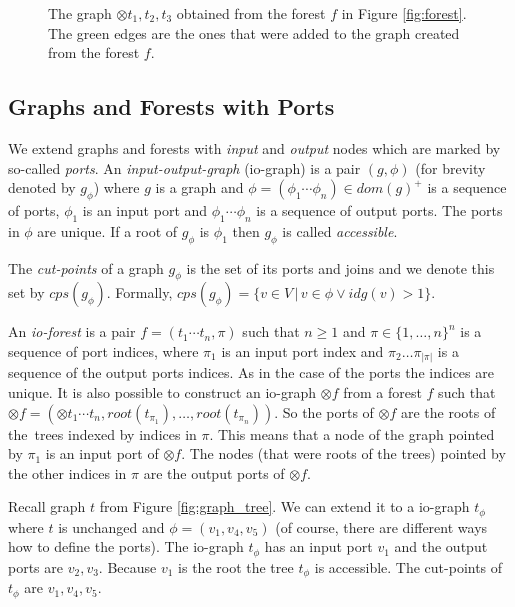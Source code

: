 	\begin{figure}[bth]
	\begin{center}
		
		\caption{The graph $\otimes t_1,t_2,t_3$ obtained from the forest $f$ in Figure \ref{fig:forest}.
		The green edges are the ones that were added to the graph created from the forest $f$.}
	  \label{fig:forest_graph}
	\end{center}
	\end{figure}
\vspace{-0.5cm}
\eexmp

\subsection{Graphs and Forests with Ports}
\label{subsec:gfp}

We extend graphs and forests with \emph{input} and \emph{output} nodes which are marked by so-called \emph{ports}.
An \emph{input-output-graph} (io-graph) is a pair $(g,\phi)$ (for brevity denoted by $g_\phi$)
where $g$ is a graph and $\phi=(\phi_1 \cdots \phi_n) \in dom(g)^+$ is a sequence of ports, $\phi_1$
is an input port and $\phi_1 \cdots \phi_n$ is a sequence of output ports.
The ports in $\phi$ are unique.
If a root of $g_\phi$ is $\phi_1$ then $g_\phi$ is called \emph{accessible}.

The \emph{cut-points} of a graph $g_\phi$ is the set of its ports
and joins and we denote this set by $cps(g_\phi)$.
Formally, $cps(g_\phi)=\{v \in V\,|\, v \in \phi \vee idg(v) > 1\}$.

An \emph{io-forest} is a pair $f=(t_1 \cdots t_n, \pi)$ such that $n \geq 1$ and $\pi \in \{1,\ldots,n\}^n$
is a sequence of port indices, where $\pi_1$ is an input port index and $\pi_2 \ldots \pi_{|\pi|}$ is a sequence
of the output ports indices.
As in the case of the ports the indices are unique.
It is also possible to construct an io-graph $\otimes f$ from a forest $f$ such that
$\otimes f = (\otimes t_1 \cdots t_n,root(t_{\pi_{1}}),\ldots,root(t_{\pi_{n}}))$.
So the ports of $\otimes f$ are the roots of the~trees indexed by indices in $\pi$.
This means that a node of the graph pointed by $\pi_1$ is an input port of $\otimes f$.
The nodes (that were roots of the trees) pointed by the other indices in $\pi$ are the output ports of $\otimes f$.

\bexmp
Recall graph $t$ from Figure \ref{fig:graph_tree}.
We can extend it to a io-graph $t_\phi$ where $t$ is unchanged and
$\phi=(v_1,v_4,v_5)$ (of course, there are different ways how to define the ports).
The io-graph $t_\phi$ has an input port $v_1$ and the output ports are $v_2,v_3$.
Because $v_1$ is the root the tree $t_\phi$ is accessible.
The cut-points of $t_\phi$ are $v_1, v_4, v_5$.

